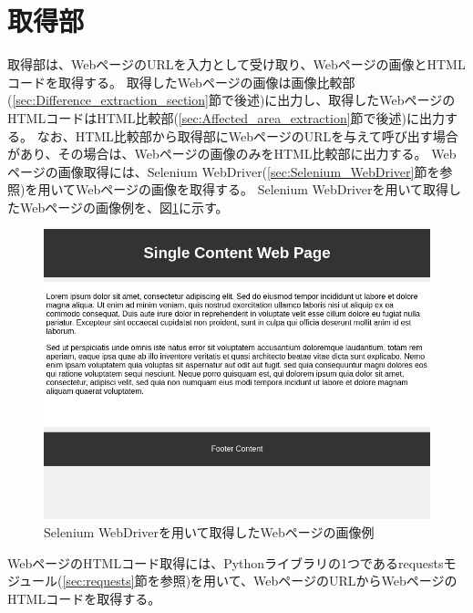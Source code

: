 \section{取得部}\label{sec:Web_data_get_section}
取得部は、WebページのURLを入力として受け取り、Webページの画像とHTMLコードを取得する。
取得したWebページの画像は画像比較部(\ref{sec:Difference_extraction_section}節で後述)に出力し、取得したWebページのHTMLコードはHTML比較部(\ref{sec:Affected_area_extraction}節で後述)に出力する。
なお、HTML比較部から取得部にWebページのURLを与えて呼び出す場合があり、その場合は、Webページの画像のみをHTML比較部に出力する。
Webページの画像取得には、Selenium WebDriver(\ref{sec:Selenium_WebDriver}節を参照)を用いてWebページの画像を取得する。
Selenium WebDriverを用いて取得したWebページの画像例を、図\ref{fig:4_get_images}に示す。
\begin{figure}[tp]
    \begin{center}
        \includegraphics[width=1.0\columnwidth]{image/4_get_images.png}
        \caption{Selenium WebDriverを用いて取得したWebページの画像例}
        \label{fig:4_get_images}
    \end{center}
\end{figure}
WebページのHTMLコード取得には、Pythonライブラリの1つであるrequestsモジュール(\ref{sec:requests}節を参照)を用いて、WebページのURLからWebページのHTMLコードを取得する。

